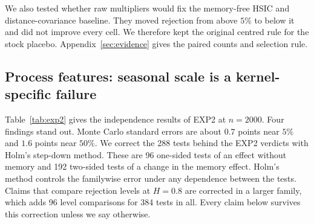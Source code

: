 \documentclass[11pt]{article}
\theoremstyle{remark}
\begin{document}
We also tested whether raw multipliers would fix the memory-free HSIC and distance-covariance baseline. They moved rejection from above $5\%$ to below it and did not improve every cell. We therefore kept the original centred rule for the stock placebo. Appendix~\ref{sec:evidence} gives the paired counts and selection rule.

\subsection{Process features: seasonal scale is a kernel-specific failure}\label{sec:exp2}
Table~\ref{tab:exp2} gives the independence results of EXP2 at $n=2000$. Four findings stand out. Monte Carlo standard errors are about $0.7$ points near $5\%$ and $1.6$ points near $50\%$. We correct the 288 tests behind the EXP2 verdicts with Holm's step-down method. These are 96 one-sided tests of an effect without memory and 192 two-sided tests of a change in the memory effect. Holm's method controls the familywise error under any dependence between the tests. Claims that compare rejection levels at $H=0.8$ are corrected in a larger family, which adds 96 level comparisons for 384 tests in all. Every claim below survives this correction unless we say otherwise.
\end{document}
